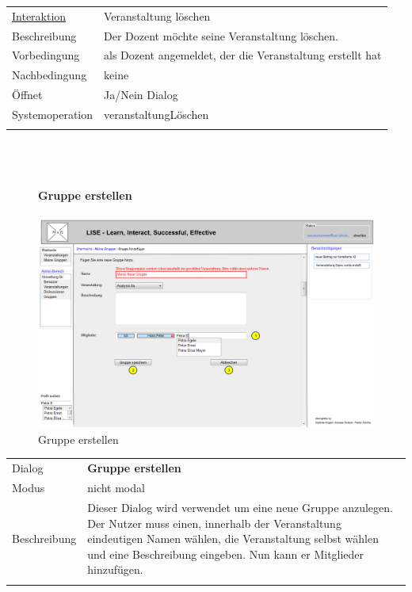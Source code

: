 \documentclass[12pt,a4paper]{article}
\begin{document}
{\begin{tabular}{l p{12cm}}
\underline{Interaktion}  	 & Veranstaltung löschen\\ 
Beschreibung   	 & Der Dozent möchte seine Veranstaltung löschen.  \\
Vorbedingung	 & als Dozent angemeldet, der die Veranstaltung erstellt hat \\
Nachbedingung	 & keine \\
Öffnet			 & \glqq Ja/Nein Dialog\grqq \\
Systemoperation & veranstaltungLöschen\\\\
\end{tabular}\\\\

\begin{figure}[H]
	\centering
	\paragraph{Gruppe erstellen}
	\includegraphics[width=\textwidth]{Bilder/Mockups/GUI/GruppeErstellen.png}
	\caption{Gruppe erstellen}
	\label{GuiGruppeErstellen}
\end{figure}
\begin{tabular}{l p{12cm}}
	Dialog 	 & \textbf{Gruppe erstellen} \\ 
	Modus & nicht modal\\ 
	Beschreibung   	& Dieser Dialog wird verwendet um eine neue Gruppe anzulegen. Der Nutzer muss einen, innerhalb der Veranstaltung eindeutigen Namen wählen, die Veranstaltung selbst wählen und eine Beschreibung eingeben. Nun kann er Mitglieder hinzufügen. \\\\
	

\end{tabular}}
\end{document}
